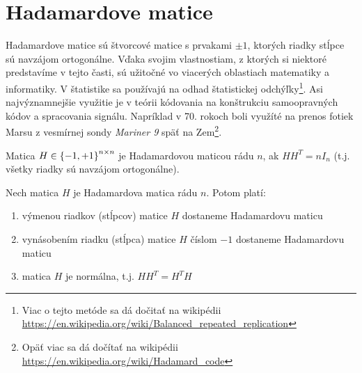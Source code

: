 \section{Hadamardove matice}

Hadamardove matice sú štvorcové matice s prvakami $\pm 1$, ktorých riadky stĺpce sú navzájom ortogonálne. Vďaka svojim vlastnostiam, z ktorých si niektoré predstavíme v tejto časti, sú užitočné vo viacerých oblastiach matematiky a informatiky. V štatistike sa používajú na odhad štatistickej odchýľky\footnote{Viac o tejto metóde sa dá dočitať na wikipédii \url{https://en.wikipedia.org/wiki/Balanced_repeated_replication}}. Asi najvýznamnejšie využitie je v teórii kódovania na konštrukciu samoopravných kódov a spracovania signálu. Napríklad v 70. rokoch boli využíté na prenos fotiek Marsu z vesmírnej sondy \emph{Mariner 9} späť na Zem\footnote{Opäť viac sa dá dočítať na wikipédii \url{https://en.wikipedia.org/wiki/Hadamard_code}}.

\begin{definition}
Matica $H \in \left\{-1, +1\right\}^{n \times n}$ je Hadamardovou maticou rádu $n$, ak $HH^T = nI_n$ (t.j. všetky riadky sú navzájom ortogonálne).
\end{definition}

\begin{theorem}
Nech matica $H$ je Hadamardova matica rádu $n$. Potom platí:
\begin{enumerate}
    \item výmenou riadkov (stĺpcov) matice $H$ dostaneme Hadamardovu maticu
	\item vynásobením riadku (stĺpca) matice $H$ číslom $-1$ dostaneme Hadamardovu maticu
    \item matica $H$ je normálna, t.j. $HH^T = H^T H$
\end{enumerate}
\end{theorem}



